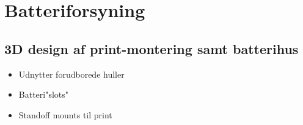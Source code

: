\section{Batteriforsyning}\label{sec:sec_batteri}

\subsection{3D design af print-montering samt batterihus}
\begin{itemize}
	\item Udnytter forudborede huller
	\item Batteri"slots"
	\item Standoff mounts til print
\end{itemize}